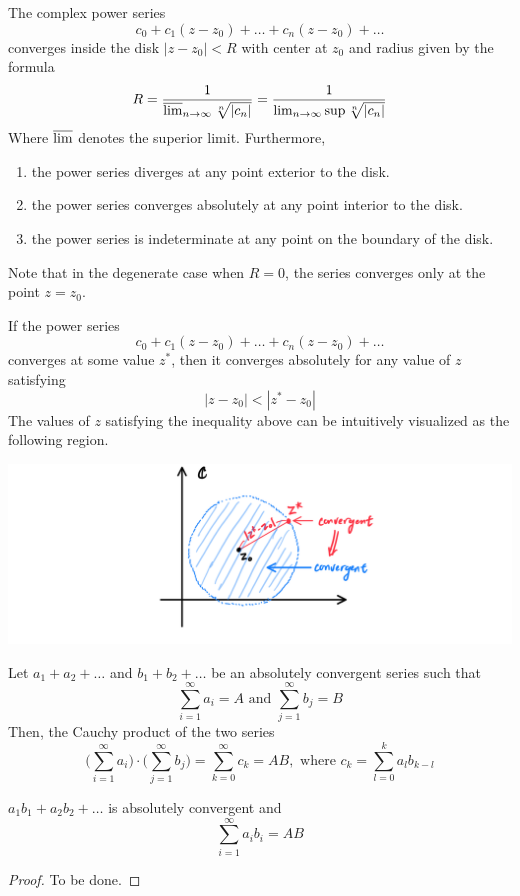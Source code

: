 \documentclass{article}
\begin{document}
  \begin{theorem}
  The complex power series 
  \[c_0 + c_1 (z - z_0) + \ldots + c_n (z - z_0) + \ldots\]
  converges inside the disk $|z - z_0| < R$ with center at $z_0$ and radius given by the formula
  \[R = \frac{1}{\varlimsup_{n \rightarrow \infty} \sqrt[n]{|c_n|}} = \frac{1}{\lim_{n \rightarrow \infty} \sup{\sqrt[n]{|c_n|}}}\]
  Where $\varlimsup$ denotes the superior limit. Furthermore, 
  \begin{enumerate}
    \item the power series diverges at any point exterior to the disk. 
    \item the power series converges absolutely at any point interior to the disk. 
    \item the power series is indeterminate at any point on the boundary of the disk. 
  \end{enumerate}
  Note that in the degenerate case when $R = 0$, the series converges only at the point $z = z_0$. 
  \end{theorem}

  \begin{corollary}
  If the power series 
  \[c_0 + c_1 (z - z_0) + \ldots + c_n (z - z_0) + \ldots\]
  converges at some value $z^*$, then it converges absolutely for any value of $z$ satisfying
  \[|z - z_0| < |z^* - z_0|\]
  The values of $z$ satisfying the inequality above can be intuitively visualized as the following region. 
  \begin{center}
      \includegraphics[scale=0.25]{img/Abels_First_Theorem.PNG}
  \end{center}
  \end{corollary}

  \begin{theorem}
  Let $a_1 + a_2 + \ldots$ and $b_1 + b_2 + \ldots$ be an absolutely convergent series such that
  \[\sum_{i=1}^\infty a_i = A \text{ and } \sum_{j=1}^\infty b_j = B\]
  Then, the Cauchy product of the two series 
  \[\bigg( \sum_{i=1}^\infty a_i \bigg) \cdot \bigg( \sum_{j=1}^\infty b_j \bigg) = \sum_{k=0}^\infty c_k = A B, \text{ where } c_k = \sum_{l=0}^k a_l b_{k-l}\]

  $a_1 b_1 + a_2 b_2 + \ldots$ is absolutely convergent and 
  \[\sum_{i = 1}^\infty a_i b_i = A B\]
  \end{theorem}
  \begin{proof}
  To be done. 
  \end{proof}
\end{document}
